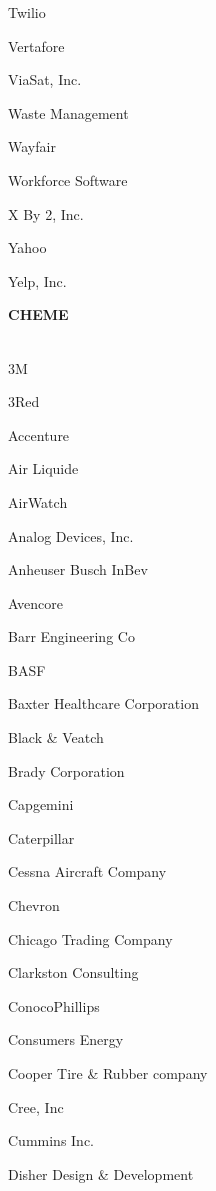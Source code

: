 \documentclass[twoside]{article}
\begin{document}
\begin{center}
\begin{multicols}{5}
\begin{FlushLeft}
\begin{compactitem}
\item Twilio
\item Vertafore
\item ViaSat, Inc.
\item Waste Management
\item Wayfair
\item Workforce Software
\item X By 2, Inc.
\item Yahoo
\item Yelp, Inc.
\end{compactitem}
        \end{FlushLeft}
        \vspace{1em}
        {\fontsize{14}{16}\selectfont \bf CHEME}\\
        \vspace{-1em}
        ~\hrulefill~
        \vspace{-.9em}
        \begin{FlushLeft}
        \begin{compactitem}
        \item 3M
\item 3Red
\item Accenture
\item Air Liquide
\item AirWatch
\item Analog Devices, Inc.
\item Anheuser Busch InBev
\item Avencore
\item Barr Engineering Co
\item BASF
\item Baxter Healthcare Corporation
\item Black \& Veatch
\item Brady Corporation
\item Capgemini
\item Caterpillar
\item Cessna Aircraft Company
\item Chevron
\item Chicago Trading Company
\item Clarkston Consulting
\item ConocoPhillips
\item Consumers Energy
\item Cooper Tire \& Rubber company
\item Cree, Inc
\item Cummins Inc.
\item Disher Design \& Development

\end{compactitem}
\end{FlushLeft}
\end{multicols}
\end{center}
\end{document}
